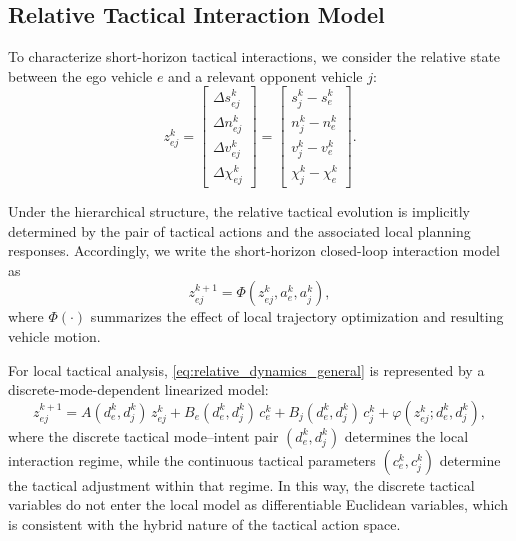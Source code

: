 \documentclass[final ,3p, times]{elsarticle}
\begin{document}
\subsection{Relative Tactical Interaction Model}
\label{subsec:relative_model}

To characterize short-horizon tactical interactions, we consider the relative state between the ego vehicle $e$ and a relevant opponent vehicle $j$:
\begin{equation}
z_{ej}^k =
\begin{bmatrix}
\Delta s_{ej}^k \\
\Delta n_{ej}^k \\
\Delta v_{ej}^k \\
\Delta \chi_{ej}^k
\end{bmatrix}
=
\begin{bmatrix}
s_j^k - s_e^k \\
n_j^k - n_e^k \\
v_j^k - v_e^k \\
\chi_j^k - \chi_e^k
\end{bmatrix}.
\label{eq:relative_state}
\end{equation}

Under the hierarchical structure, the relative tactical evolution is implicitly determined by the pair of tactical actions and the associated local planning responses. Accordingly, we write the short-horizon closed-loop interaction model as
\begin{equation}
z_{ej}^{k+1}
=
\Phi\!\left(z_{ej}^k, a_e^k, a_j^k \right),
\label{eq:relative_dynamics_general}
\end{equation}
where $\Phi(\cdot)$ summarizes the effect of local trajectory optimization and resulting vehicle motion.


For local tactical analysis, \eqref{eq:relative_dynamics_general} is represented by a discrete-mode-dependent linearized model:
\begin{equation}
z_{ej}^{k+1}
=
A(d_e^k,d_j^k)\, z_{ej}^k
+
B_e(d_e^k,d_j^k)\, c_e^k
+
B_j(d_e^k,d_j^k)\, c_j^k
+
\varphi\!\left(z_{ej}^k; d_e^k,d_j^k\right),
\label{eq:relative_dynamics_linearized}
\end{equation}
where the discrete tactical mode--intent pair $(d_e^k,d_j^k)$ determines the local interaction regime, while the continuous tactical parameters $(c_e^k,c_j^k)$ determine the tactical adjustment within that regime. In this way, the discrete tactical variables do not enter the local model as differentiable Euclidean variables, which is consistent with the hybrid nature of the tactical action space.
\end{document}
